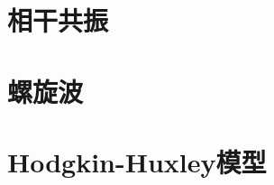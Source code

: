 \documentclass[
pdflinks,
]{xjtuthesis}
\begin{document}
\section{相干共振}

\section{螺旋波}

\section{Hodgkin-Huxley模型}

\newcommand{\ai}{\alpha_i}
\newcommand{\am}{\alpha_m}
\newcommand{\an}{\alpha_n}
\newcommand{\ah}{\alpha_h}

\newcommand{\ambar}{\overline{\am}}
\newcommand{\anbar}{\overline{\an}}
\newcommand{\ahbar}{\overline{\an}}

\newcommand{\bi}{\beta_i}
\newcommand{\bm}{\beta_m}
\newcommand{\bn}{\beta_n}
\newcommand{\bh}{\beta_h}

\newcommand{\bmbar}{\overline{\bm}}
\newcommand{\bnbar}{\overline{\bn}}
\newcommand{\bhbar}{\overline{\bn}}

\newcommand{\go}{G_{\omega}}
\newcommand{\gna}{G_{Na}}
\newcommand{\gk}{G_{K}}
\newcommand{\gl}{G_{l}}

\newcommand{\gobar}{\overline{g_{\omega}}}
\newcommand{\gnabar}{\overline{g_{Na}}}
\newcommand{\gkbar}{\overline{g_{K}}}
\newcommand{\glbar}{\overline{g_l}}

\newcommand{\vna}{V_{Na}}
\newcommand{\vk}{V_{K}}
\newcommand{\vl}{V_{l}}

\newcommand{\vmbar}{\overline{V_m}}
\newcommand{\vnbar}{\overline{V_n}}
\newcommand{\vhbar}{\overline{V_h}}
\end{document}
